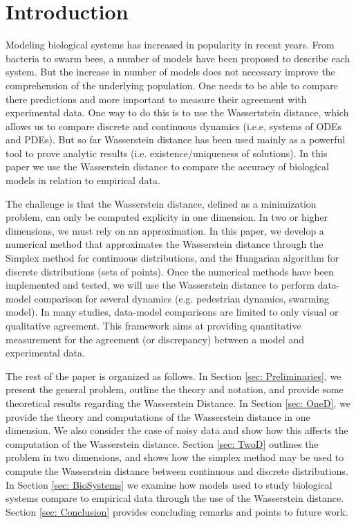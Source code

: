 \documentclass[10pt]{article}
\begin{document}
\newpage
\section{Introduction}

  Modeling biological systems has increased in popularity in recent years. From bacteria to swarm bees, a number of models have been proposed to describe each system. But the increase in number of models does not necessary improve the comprehension of the underlying population. One needs to be able to compare there predictions and more important to measure their agreement with experimental data. One way to do this is to use the Wassertstein distance, which allows us to compare discrete and continuous dynamics (i.e.e, systems of ODEs and PDEs). But so far Wasserstein distance has been used mainly as a powerful tool to prove analytic results (i.e. existence/uniqueness of solutions). In this paper we use the Wasserstein distance to compare the accuracy of biological models in relation to empirical data. 


The challenge is that the Wasserstein distance, defined as a minimization problem,
can only be computed explicity in one dimension. In two or higher dimensions, we must rely on an approximation. In this paper, we develop a numerical method that approximates the Wasserstein distance through the Simplex method for continuous distributions, and the Hungarian algorithm for discrete distributions (sets of points). Once the numerical methods have been implemented and tested, we will use the Wasserstein distance to perform data-model comparison for several dynamics (e.g. pedestrian dynamics, swarming model). In many studies, data-model comparisons are limited to only visual or qualitative agreement. This framework aims at providing quantitative measurement for the agreement (or discrepancy) between a model and experimental data.

The rest of the paper is organized as follows. In Section \ref{sec: Preliminaries}, we present the general problem, outline the theory and notation, and provide some theoretical results regarding the Wasserstein Distance. In Section \ref{sec: OneD}, we provide the theory and computations of the Wasserstein distance in one dimension. We also consider the case of noisy data and show how this affects the computation of the Wasserstein distance. Section \ref{sec: TwoD} outlines the problem in two dimensions, and shows how the simplex method may be used to compute the Wasserstein distance between continuous and discrete distributions. In Section \ref{sec: BioSystems} we examine how models used to study biological systems compare to empirical data through the use of the Wasserstein distance. Section \ref{sec: Conclusion} provides concluding remarks and points to future work.
\end{document}
